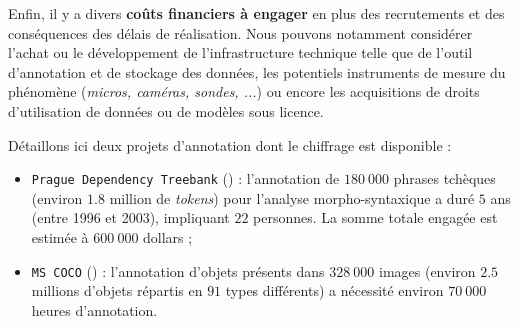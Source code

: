 			Enfin, il y a divers \textbf{coûts financiers à engager} en plus des recrutements et des conséquences des délais de réalisation.
			Nous pouvons notamment considérer l'achat ou le développement de l'infrastructure technique telle que de l'outil d'annotation et de stockage des données, les potentiels instruments de mesure du phénomène (\textit{micros, caméras, sondes, ...}) ou encore les acquisitions de droits d'utilisation de données ou de modèles sous licence.
			
			\begin{leftBarExamples}
				Détaillons ici deux projets d'annotation dont le chiffrage est disponible :
				\begin{itemize}
					\item \texttt{Prague Dependency Treebank} (\cite{bohmova-etal:2003:prague-dependency-treebank}) :
					l'annotation de $180~000$ phrases tchèques (environ $1.8$ million de \textit{tokens}) pour l'analyse morpho-syntaxique a duré $5$ ans (entre 1996 et 2003), impliquant $22$ personnes.
					La somme totale engagée est estimée à $600~000$ dollars ;
					\item \texttt{MS COCO} (\cite{lin-etal:2014:microsoft-coco-common}) :
					l'annotation d'objets présents dans $328~000$ images (environ $2.5$ millions d'objets répartis en $91$ types différents) a nécessité environ $70~000$ heures d'annotation.
				\end{itemize}
			\end{leftBarExamples}
			
